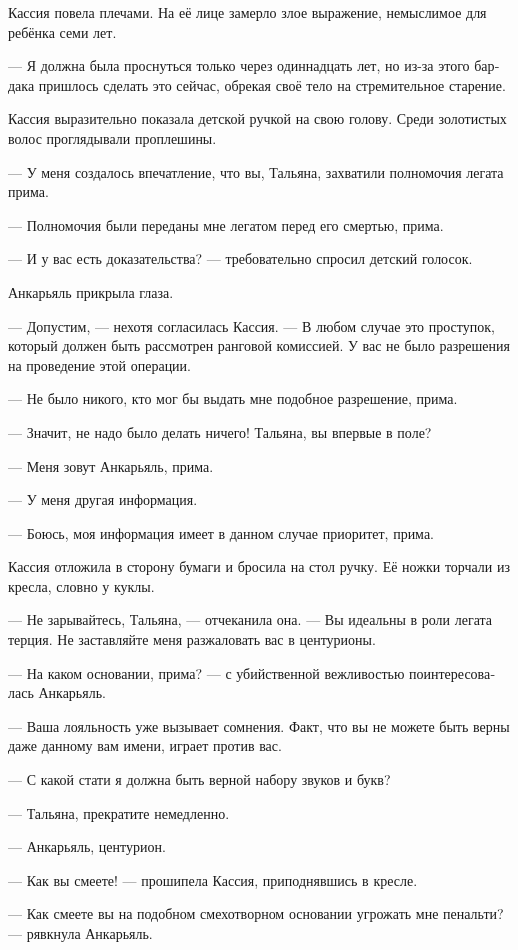 \documentclass[a4paper,12pt,fleqn]{book}\usepackage{polyglossia}\setdefaultlanguage[babelshorthands=true]{russian}\setotherlanguage{english}\defaultfontfeatures{Ligatures=TeX,Mapping=tex-text}\usepackage{xcolor}\newcommand{\ml}[3]{#2}
\begin{document}
Кассия повела плечами.
На её лице замерло злое выражение, немыслимое для ребёнка семи лет.

--- Я должна была проснуться только через одиннадцать лет, но из-за этого бардака пришлось сделать это сейчас, обрекая своё тело на стремительное старение.

Кассия выразительно показала детской ручкой на свою голову.
Среди золотистых волос проглядывали проплешины.

--- У меня создалось впечатление, что вы, Тальяна, захватили полномочия легата прима.

--- Полномочия были переданы мне легатом перед его смертью, прима.

--- И у вас есть доказательства? --- требовательно спросил детский голосок.

Анкарьяль прикрыла глаза.

--- Допустим, --- нехотя согласилась Кассия.
--- В любом случае это проступок, который должен быть рассмотрен ранговой комиссией.
У вас не было разрешения на проведение этой операции.

--- Не было никого, кто мог бы выдать мне подобное разрешение, прима.

--- Значит, не надо было делать ничего!
Тальяна, вы впервые в поле?

--- Меня зовут Анкарьяль, прима.

--- У меня другая информация.

--- Боюсь, моя информация имеет в данном случае приоритет, прима.

Кассия отложила в сторону бумаги и бросила на стол ручку.
Её ножки торчали из кресла, словно у куклы.

--- Не зарывайтесь, Тальяна, --- отчеканила она.
--- Вы идеальны в роли легата терция.
Не заставляйте меня разжаловать вас в центурионы.

--- На каком основании, прима? --- с убийственной вежливостью поинтересовалась Анкарьяль.

--- Ваша лояльность уже вызывает сомнения.
Факт, что вы не можете быть верны даже данному вам имени, играет против вас.

--- С какой стати я должна быть верной набору звуков и букв?

--- Тальяна, прекратите немедленно.

--- Анкарьяль, центурион.

--- Как вы смеете! --- прошипела Кассия, приподнявшись в кресле.

--- Как смеете вы на подобном смехотворном основании угрожать мне пенальти? --- рявкнула Анкарьяль.
\end{document}

